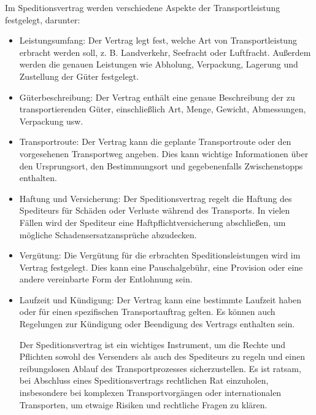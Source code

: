     Im Speditionsvertrag werden verschiedene Aspekte der Transportleistung festgelegt, darunter:
    \begin{itemize}
        \item Leistungsumfang: Der Vertrag legt fest, welche Art von Transportleistung erbracht werden soll, z. B. Landverkehr, Seefracht oder Luftfracht. Außerdem werden die genauen Leistungen wie Abholung, Verpackung, Lagerung und Zustellung der Güter festgelegt.
        \item Güterbeschreibung: Der Vertrag enthält eine genaue Beschreibung der zu transportierenden Güter, einschließlich Art, Menge, Gewicht, Abmessungen, Verpackung usw.
        \item Transportroute: Der Vertrag kann die geplante Transportroute oder den vorgesehenen Transportweg angeben. Dies kann wichtige Informationen über den Ursprungsort, den Bestimmungsort und gegebenenfalls Zwischenstopps enthalten.
        \item Haftung und Versicherung: Der Speditionsvertrag regelt die Haftung des Spediteurs für Schäden oder Verluste während des Transports. In vielen Fällen wird der Spediteur eine Haftpflichtversicherung abschließen, um mögliche Schadensersatzansprüche abzudecken.
        \item Vergütung: Die Vergütung für die erbrachten Speditionsleistungen wird im Vertrag festgelegt. Dies kann eine Pauschalgebühr, eine Provision oder eine andere vereinbarte Form der Entlohnung sein.
        \item Laufzeit und Kündigung: Der Vertrag kann eine bestimmte Laufzeit haben oder für einen spezifischen Transportauftrag gelten. Es können auch Regelungen zur Kündigung oder Beendigung des Vertrags enthalten sein.

    Der Speditionsvertrag ist ein wichtiges Instrument, um die Rechte und Pflichten sowohl des Versenders als auch des Spediteurs zu regeln und einen reibungslosen Ablauf des Transportprozesses sicherzustellen. Es ist ratsam, bei Abschluss eines Speditionsvertrags rechtlichen Rat einzuholen, insbesondere bei komplexen Transportvorgängen oder internationalen Transporten, um etwaige Risiken und rechtliche Fragen zu klären.
\end{itemize}
